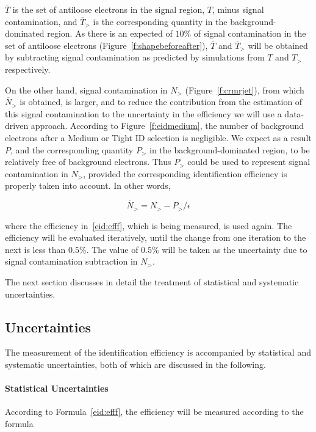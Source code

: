 $\overline{T}$ is the set of antiloose electrons in the signal region, $T$,
minus signal contamination, and $\overline{T}_>$ is the corresponding quantity
in the background-dominated region. As there is an expected of $10\%$ of signal
contamination in the set of antiloose electrons
(Figure~\ref{f:shapebeforeafter}), $\overline{T}$ and $\overline{T}_>$ will be
obtained by subtracting signal contamination as predicted by simulations from
$T$ and $T_>$ respectively.

On the other hand, signal contamination in $N_>$ (Figure~\ref{f:crmrjet}), from
which $\overline{N}_>$ is obtained, is larger, and to reduce the contribution
from the estimation of this signal contamination to the uncertainty in the
efficiency we will use a data-driven approach. According to
Figure~\ref{f:eidmedium}, the number of background electrons after a Medium or
Tight ID selection is negligible. We expect as a result $P$, and the
corresponding quantity $P_>$ in the background-dominated region, to be
relatively free of background electrons. Thus $P_>$ could be used to represent
signal contamination in $N_>$, provided the corresponding identification
efficiency is properly taken into account. In other words,

%
$$\overline{N}_> = N_> - P_> / \epsilon $$
%

where the efficiency in~\ref{eid:efff}, which is being measured, is used again.
The efficiency will be evaluated iteratively, until the change from one
iteration to the next is less than $0.5\%$. The value of $0.5\%$ will be taken
as the uncertainty due to signal contamination subtraction in $N_>$.

The next section discusses in detail the treatment of statistical and
systematic uncertainties.

\subsection{Uncertainties}\label{s:eidunc}

The measurement of the identification efficiency is accompanied by statistical
and systematic uncertainties, both of which are discussed in the following.

\paragraph{Statistical Uncertainties} According to Formula~\ref{eid:efff}, the
efficiency will be measured according to the formula


